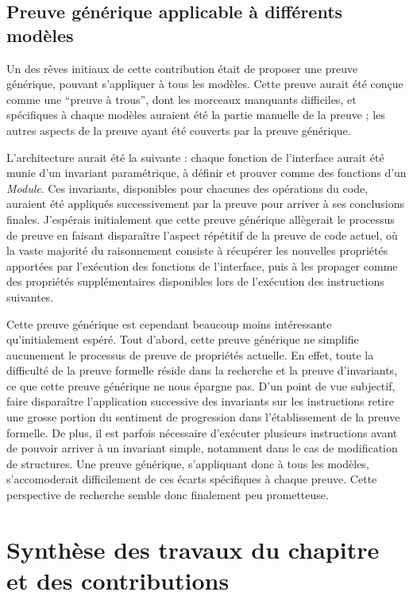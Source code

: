 		\subsection{Preuve générique applicable à différents modèles}

		Un des rêves initiaux de cette contribution était de proposer une preuve générique, pouvant s'appliquer à tous les modèles. Cette preuve aurait été conçue comme une ``preuve à trous'', dont les morceaux manquants difficiles, et spécifiques à chaque modèles auraient été la partie manuelle de la preuve ; les autres aspects de la preuve ayant été couverts par la preuve générique.

		L'architecture aurait été la suivante : chaque fonction de l'interface aurait été munie d'un invariant paramétrique, à définir et prouver comme des fonctions d'un \emph{Module}. Ces invariants, disponibles pour chacunes des opérations du code, auraient été appliqués successivement par la preuve pour arriver à ses conclusions finales. J'espérais initialement que cette preuve générique allègerait le processus de preuve en faisant disparaître l'aspect répétitif de la preuve de code actuel, où la vaste majorité du raisonnement consiste à récupérer les nouvelles propriétés apportées par l'exécution des fonctions de l'interface, puis à les propager comme des propriétés supplémentaires disponibles lors de l'exécution des instructions suivantes.

		Cette preuve générique est cependant beaucoup moins intéressante qu'initialement espéré. Tout d'abord, cette preuve générique ne simplifie aucunement le processus de preuve de propriétés actuelle. En effet, toute la difficulté de la preuve formelle réside dans la recherche et la preuve d'invariants, ce que cette preuve générique ne nous épargne pas. D'un point de vue subjectif, faire disparaître l'application successive des invariants sur les instructions retire une grosse portion du sentiment de progression dans l'établissement de la preuve formelle. De plus, il est parfois nécessaire d'exécuter plusieurs instructions avant de pouvoir arriver à un invariant simple, notamment dans le cas de modification de structures. Une preuve générique, s'appliquant donc à tous les modèles, s'accomoderait difficilement de ces écarts spécifiques à chaque preuve. Cette perspective de recherche semble donc finalement peu prometteuse.

		\section{Synthèse des travaux du chapitre et des contributions}

